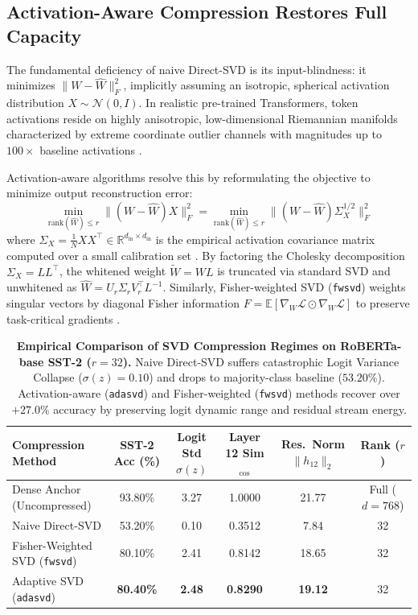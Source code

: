\documentclass{article}
\begin{document}
\subsection{Activation-Aware Compression Restores Full Capacity}
The fundamental deficiency of naive Direct-SVD is its input-blindness: it minimizes $\|W - \hat{W}\|_F^2$, implicitly assuming an isotropic, spherical activation distribution $X \sim \mathcal{N}(0, I)$. In realistic pre-trained Transformers, token activations reside on highly anisotropic, low-dimensional Riemannian manifolds characterized by extreme coordinate outlier channels with magnitudes up to $100\times$ baseline activations \citep{dettmers2022llmint8}.

Activation-aware algorithms resolve this by reformulating the objective to minimize output reconstruction error:
\begin{equation}
    \min_{\text{rank}(\hat{W}) \le r} \| (W - \hat{W}) X \|_F^2 = \min_{\text{rank}(\hat{W}) \le r} \| (W - \hat{W}) \Sigma_X^{1/2} \|_F^2
\end{equation}
where $\Sigma_X = \frac{1}{N} X X^\top \in \mathbb{R}^{d_{\text{in}} \times d_{\text{in}}}$ is the empirical activation covariance matrix computed over a small calibration set \citep{aa_svd_2026}. By factoring the Cholesky decomposition $\Sigma_X = L L^\top$, the whitened weight $\tilde{W} = W L$ is truncated via standard SVD and unwhitened as $\hat{W} = U_r \Sigma_r V_r^\top L^{-1}$. Similarly, Fisher-weighted SVD (\texttt{fwsvd}) weights singular vectors by diagonal Fisher information $F = \mathbb{E}[\nabla_W \mathcal{L} \odot \nabla_W \mathcal{L}]$ to preserve task-critical gradients \citep{fwsvd_2026}.

\begin{table}[t]
\centering
\caption{\textbf{Empirical Comparison of SVD Compression Regimes on RoBERTa-base SST-2 ($r = 32$).} 
Naive Direct-SVD suffers catastrophic Logit Variance Collapse ($\sigma(z) = 0.10$) and drops to majority-class baseline ($53.20\%$). Activation-aware (\texttt{adasvd}) and Fisher-weighted (\texttt{fwsvd}) methods recover over $+27.0\%$ accuracy by preserving logit dynamic range and residual stream energy.}
\label{tab:roberta_svd_collapse}
\small
\setlength{\tabcolsep}{8pt}
\begin{tabular}{lccccc}
\toprule
\textbf{Compression Method} & \textbf{SST-2 Acc (\%)} & \textbf{Logit Std $\sigma(z)$} & \textbf{Layer 12 Sim$_{\cos}$} & \textbf{Res.\ Norm $\|h_{12}\|_2$} & \textbf{Rank ($r$)} \\
\midrule
Dense Anchor (Uncompressed) & 93.80\% & 3.27 & 1.0000 & 21.77 & Full ($d=768$) \\
\midrule
Naive Direct-SVD & 53.20\% & 0.10 & 0.3512 & 7.84 & 32 \\
Fisher-Weighted SVD (\texttt{fwsvd}) \citep{fwsvd_2026} & 80.10\% & 2.41 & 0.8142 & 18.65 & 32 \\
Adaptive SVD (\texttt{adasvd}) \citep{adasvd_2026} & \textbf{80.40\%} & \textbf{2.48} & \textbf{0.8290} & \textbf{19.12} & 32 \\
\bottomrule
\end{tabular}
\end{table}
\end{document}
